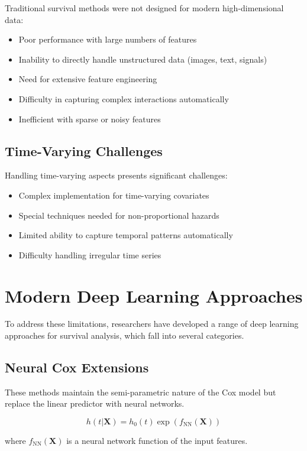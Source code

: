 Traditional survival methods were not designed for modern high-dimensional data:

\begin{itemize}
    \item Poor performance with large numbers of features
    \item Inability to directly handle unstructured data (images, text, signals)
    \item Need for extensive feature engineering
    \item Difficulty in capturing complex interactions automatically
    \item Inefficient with sparse or noisy features
\end{itemize}

\subsection{Time-Varying Challenges}

Handling time-varying aspects presents significant challenges:

\begin{itemize}
    \item Complex implementation for time-varying covariates
    \item Special techniques needed for non-proportional hazards
    \item Limited ability to capture temporal patterns automatically
    \item Difficulty handling irregular time series
\end{itemize}

\section{Modern Deep Learning Approaches}

To address these limitations, researchers have developed a range of deep learning approaches for survival analysis, which fall into several categories.

\subsection{Neural Cox Extensions}

These methods maintain the semi-parametric nature of the Cox model but replace the linear predictor with neural networks.

\begin{equationbox}[title=Neural Cox Models]
\begin{equation}
h(t|\mathbf{X}) = h_0(t) \exp(f_{\text{NN}}(\mathbf{X}))
\end{equation}

where $f_{\text{NN}}(\mathbf{X})$ is a neural network function of the input features.
\end{equationbox}

